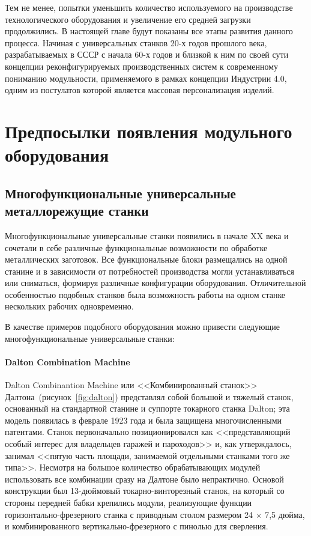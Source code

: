 Тем не менее, попытки уменьшить количество используемого на производстве технологического оборудования и увеличение его средней загрузки продолжились. В настоящей главе будут показаны все этапы развития данного процесса. Начиная с универсальных станков 20-х годов прошлого века, разрабатываемых в СССР с начала 60-х годов и близкой к ним по своей сути концепции реконфигурируемых производственных систем к современному пониманию модульности, применяемого в рамках концепции Индустрии 4.0, одним из постулатов которой является массовая персонализация изделий.

\section{Предпосылки появления модульного оборудования}

\subsection{Многофункциональные универсальные металлорежущие станки}\label{sec:ch1/multifunc-machines}

Многофункциональные универсальные станки появились в начале XX века и сочетали в себе различные функциональные возможности по обработке металлических заготовок. Все функциональные блоки размещались на одной станине и в зависимости от потребностей производства могли устанавливаться или сниматься, формируя различные конфигурации оборудования. Отличительной особенностью подобных станков была возможность работы на одном станке нескольких рабочих одновременно.

В качестве примеров подобного оборудования можно привести следующие многофункциональные универсальные станки:

\paragraph{Dalton Combination Machine}

Dalton Combinantion Machine или <<Комбинированный станок>> Далтона~(рисунок~\cref{fig:dalton}) представлял собой большой и тяжелый станок, основанный на стандартной станине и суппорте токарного станка Dalton; эта модель появилась в феврале 1923 года и была защищена многочисленными патентами. Станок первоначально позиционировался как <<представляющий особый интерес для владельцев гаражей и пароходов>> и, как утверждалось, занимал <<пятую часть площади, занимаемой отдельными станками того же типа>>. Несмотря на большое количество обрабатывающих модулей использовать все комбинации сразу на Далтоне было непрактично. Основой конструкции был 13-дюймовый токарно-винторезный станок, на который со стороны передней бабки крепились модули, реализующие функции горизонтально-фрезерного станка с приводным столом размером 24 $\times$ 7,5 дюйма, и комбинированного вертикально-фрезерного с пинолью для сверления. 


